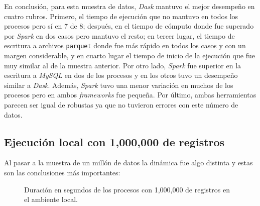 En conclusión, para esta muestra de datos, \textit{Dask} mantuvo el mejor desempeño en cuatro rubros. Primero, el tiempo de ejecución que no mantuvo en todos los procesos pero sí en 7 de 8; después, en el tiempo de cómputo donde fue superado por \textit{Spark} en dos casos pero mantuvo el resto; en tercer lugar, el tiempo de escritura a archivos \texttt{parquet} donde fue más rápido en todos los casos y con un margen considerable, y en cuarto lugar el tiempo de inicio de la ejecución que fue muy similar al de la muestra anterior. Por otro lado, \textit{Spark} fue superior en la escritura a \textit{MySQL} en dos de los procesos y en los otros tuvo un desempeño similar a \textit{Dask}. Además, \textit{Spark} tuvo una menor variación en muchos de los procesos pero en ambos \textit{frameworks} fue pequeña. Por último, ambas herramientas parecen ser igual de robustas ya que no tuvieron errores con este número de datos. 


\subsection{Ejecución local con 1,000,000 de registros}

Al pasar a la muestra de un millón de datos la dinámica fue algo distinta y estas son las conclusiones más importantes:

\begin{center}
\begin{figure}
\caption{Duración en segundos de los procesos con 1,000,000 de registros en el ambiente local.}
\label{barras:duracion1M}
\end{figure}
\end{center}

